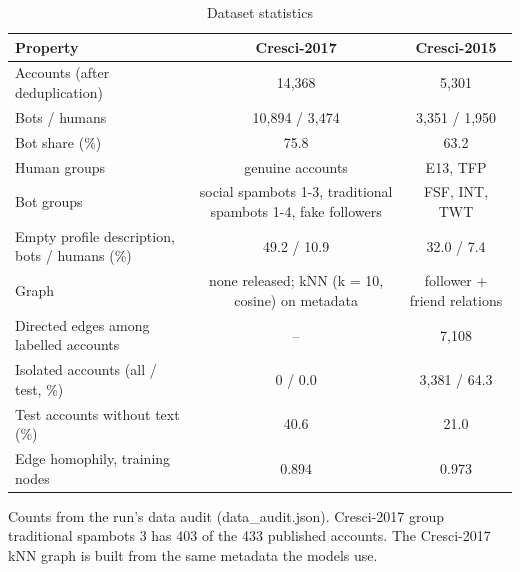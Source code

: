 \begin{table}[!t]
\caption{Dataset statistics}
\label{tab:dataset_statistics}
\centering\footnotesize
\setlength{\tabcolsep}{3pt}
\begin{tabular}{lcc}
\hline
Property & Cresci-2017 & Cresci-2015 \\
\hline
Accounts (after deduplication) & 14,368 & 5,301 \\
Bots / humans & 10,894 / 3,474 & 3,351 / 1,950 \\
Bot share (\%) & 75.8 & 63.2 \\
Human groups & genuine accounts & E13, TFP \\
Bot groups & social spambots 1-3, traditional spambots 1-4, fake followers & FSF, INT, TWT \\
Empty profile description, bots / humans (\%) & 49.2 / 10.9 & 32.0 / 7.4 \\
Graph & none released; kNN (k = 10, cosine) on metadata & follower + friend relations \\
Directed edges among labelled accounts & -- & 7,108 \\
Isolated accounts (all / test, \%) & 0 / 0.0 & 3,381 / 64.3 \\
Test accounts without text (\%) & 40.6 & 21.0 \\
Edge homophily, training nodes & 0.894 & 0.973 \\
\hline
\end{tabular}
\par\smallskip\parbox{\linewidth}{\scriptsize Counts from the run's data audit (data\_audit.json). Cresci-2017 group traditional spambots 3 has 403 of the 433 published accounts. The Cresci-2017 kNN graph is built from the same metadata the models use.}
\end{table}